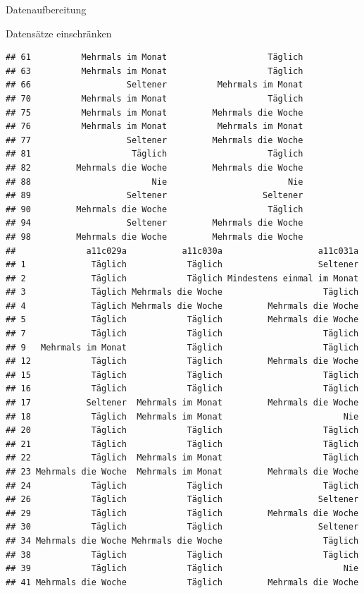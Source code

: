 \documentclass[ignorenonframetext,]{beamer}
\begin{document}
\begin{frame}[fragile]{Datenaufbereitung}
\begin{block}{Datensätze einschränken}
\begin{verbatim}
## 61          Mehrmals im Monat                    Täglich
## 63          Mehrmals im Monat                    Täglich
## 66                   Seltener          Mehrmals im Monat
## 70          Mehrmals im Monat                    Täglich
## 75          Mehrmals im Monat         Mehrmals die Woche
## 76          Mehrmals im Monat          Mehrmals im Monat
## 77                   Seltener         Mehrmals die Woche
## 81                    Täglich                    Täglich
## 82         Mehrmals die Woche         Mehrmals die Woche
## 88                        Nie                        Nie
## 89                   Seltener                   Seltener
## 90         Mehrmals die Woche                    Täglich
## 94                   Seltener         Mehrmals die Woche
## 98         Mehrmals die Woche         Mehrmals die Woche
##              a11c029a           a11c030a                   a11c031a
## 1             Täglich            Täglich                   Seltener
## 2             Täglich            Täglich Mindestens einmal im Monat
## 3             Täglich Mehrmals die Woche                    Täglich
## 4             Täglich Mehrmals die Woche         Mehrmals die Woche
## 5             Täglich            Täglich         Mehrmals die Woche
## 7             Täglich            Täglich                    Täglich
## 9   Mehrmals im Monat            Täglich                    Täglich
## 12            Täglich            Täglich         Mehrmals die Woche
## 15            Täglich            Täglich                    Täglich
## 16            Täglich            Täglich                    Täglich
## 17           Seltener  Mehrmals im Monat         Mehrmals die Woche
## 18            Täglich  Mehrmals im Monat                        Nie
## 20            Täglich            Täglich                    Täglich
## 21            Täglich            Täglich                    Täglich
## 22            Täglich  Mehrmals im Monat                    Täglich
## 23 Mehrmals die Woche  Mehrmals im Monat         Mehrmals die Woche
## 24            Täglich            Täglich                    Täglich
## 26            Täglich            Täglich                   Seltener
## 29            Täglich            Täglich         Mehrmals die Woche
## 30            Täglich            Täglich                   Seltener
## 34 Mehrmals die Woche Mehrmals die Woche                    Täglich
## 38            Täglich            Täglich                    Täglich
## 39            Täglich            Täglich                        Nie
## 41 Mehrmals die Woche            Täglich         Mehrmals die Woche

\end{verbatim}
\end{block}
\end{frame}
\end{document}
